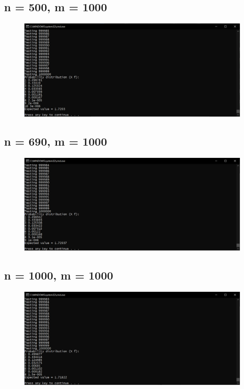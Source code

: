 \documentclass[12pt]{article}
\begin{document}
\subsection{n = 500, m = 1000}
\begin{figure}[H]
\centering
\includegraphics[scale=0.5]{500-1000-1000k.PNG}
\end{figure}
\subsection{n = 690, m = 1000}
\begin{figure}[H]
\centering
\includegraphics[scale=0.5]{690-1000-1000k.PNG}
\end{figure}
\subsection{n = 1000, m = 1000}
\begin{figure}[H]
\centering
\includegraphics[scale=0.5]{1000-1000-1000k.PNG}
\end{figure}
\end{document}
